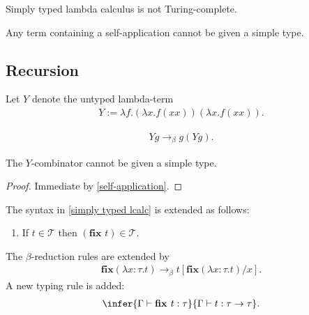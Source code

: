 \documentclass{article}
\begin{document}
\begin{corollary*}[III.14]
	Simply typed lambda calculus is not Turing-complete.
\end{corollary*}

\begin{proposition}[III.15]
	\label{self-application}
	Any term containing a self-application cannot be given a simple type.
\end{proposition}

\subsection{Recursion}

\begin{definition*}[Y-combinator]
	Let $Y$ denote the untyped lambda-term
	\begin{align*}
		Y := \lambda f. (\lambda x. f (x x)) (\lambda x. f (x x)).
	\end{align*}
\end{definition*}

\begin{lemma*}
	\begin{align*}
		Y g \to_\beta g (Y g).
	\end{align*}
\end{lemma*}

\begin{corollary*}
	The $Y$-combinator cannot be given a simple type.
	\begin{proof}
		Immediate by \ref{self-application}.
	\end{proof}
\end{corollary*}

\begin{definition*}
	The syntax in \ref{simply typed lcalc} is extended as follows:
	\begin{enumerate}[label=L4.]
		\item If $t\in\mathcal{T}$ then $(\textbf{fix }t)\in\mathcal{T}$.
	\end{enumerate}
	The $\beta$-reduction rules are extended by \begin{align*}
		\textbf{fix}(\lambda x:\tau.t)\to_\beta t[\textbf{fix}(\lambda x:\tau.t)/x].
	\end{align*}
	A new typing rule is added: \begin{align*}
		\infer{\Gamma \vdash \textbf{fix }t:\tau}{\Gamma \vdash t:\tau\to\tau}.
	\end{align*}
\end{definition*}
\end{document}
